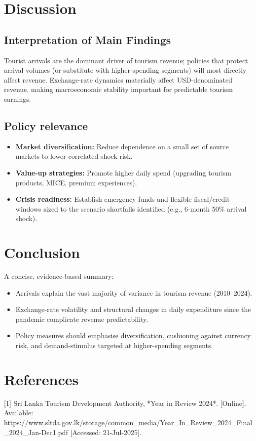 \documentclass[12pt,a4paper]{article}
\begin{document}
\section{Discussion}
\subsection{Interpretation of Main Findings}
Tourist arrivals are the dominant driver of tourism revenue; policies that protect arrival volumes (or substitute with higher-spending segments) will most directly affect revenue. Exchange-rate dynamics materially affect USD-denominated revenue, making macroeconomic stability important for predictable tourism earnings.

\subsection{Policy relevance}
\begin{itemize}
  \item \textbf{Market diversification:} Reduce dependence on a small set of source markets to lower correlated shock risk.
  \item \textbf{Value-up strategies:} Promote higher daily spend (upgrading tourism products, MICE, premium experiences).
  \item \textbf{Crisis readiness:} Establish emergency funds and flexible fiscal/credit windows sized to the scenario shortfalls identified (e.g., 6-month 50\% arrival shock).
\end{itemize}

\section{Conclusion}
A concise, evidence-based summary:
\begin{itemize}
  \item Arrivals explain the vast majority of variance in tourism revenue (2010--2024).
  \item Exchange-rate volatility and structural changes in daily expenditure since the pandemic complicate revenue predictability.
  \item Policy measures should emphasise diversification, cushioning against currency risk, and demand-stimulus targeted at higher-spending segments.
\end{itemize}

\section*{References} 
[1] Sri Lanka Tourism Development Authority, *Year in Review 2024*. [Online]. Available: https://www.sltda.gov.lk/storage/common_media/Year_In_Review_2024_Final_2024_Jan-Dec1.pdf [Accessed: 21-Jul-2025].\\
\end{document}

